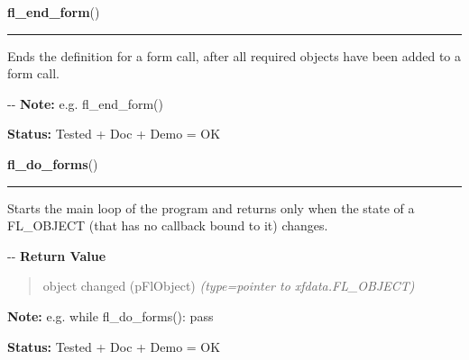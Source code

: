     \label{xformslib:flbasic:fl_end_form}

    \vspace{0.5ex}

\hspace{.8\funcindent}\begin{boxedminipage}{\funcwidth}

    \raggedright \textbf{fl\_end\_form}()

    \vspace{-1.5ex}

    \rule{\textwidth}{0.5\fboxrule}
\setlength{\parskip}{2ex}

Ends the definition for a form call, after all required objects have
been added to a form call.

-{}-
\setlength{\parskip}{1ex}
\textbf{Note:} 
e.g. fl\_end\_form()


\textbf{Status:} 
Tested + Doc + Demo = OK


    \end{boxedminipage}

    \label{xformslib:flbasic:fl_do_forms}

    \vspace{0.5ex}

\hspace{.8\funcindent}\begin{boxedminipage}{\funcwidth}

    \raggedright \textbf{fl\_do\_forms}()

    \vspace{-1.5ex}

    \rule{\textwidth}{0.5\fboxrule}
\setlength{\parskip}{2ex}

Starts the main loop of the program and returns only when the state of
a FL\_OBJECT (that has no callback bound to it) changes.

-{}-
\setlength{\parskip}{1ex}
      \textbf{Return Value}
    \vspace{-1ex}

      \begin{quote}

object changed (pFlObject)
      {\it (type=pointer to xfdata.FL\_OBJECT)}

      \end{quote}

\textbf{Note:} 
e.g. while fl\_do\_forms(): pass


\textbf{Status:} 
Tested + Doc + Demo = OK


    \end{boxedminipage}

